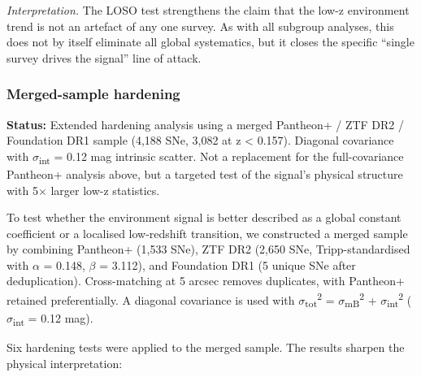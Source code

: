 \documentclass[11pt,a4paper]{article}
\begin{document}
\emph{Interpretation.} The LOSO test strengthens the claim that the low-z environment trend is not an artefact of any one survey. As with all subgroup analyses, this does not by itself eliminate all global systematics, but it closes the specific ``single survey drives the signal'' line of attack.

\subsubsection{Merged-sample hardening}
\begin{mdframed}[linecolor=accent,linewidth=0.5pt,backgroundcolor=callout-bg,leftline=true,rightline=true,topline=true,bottomline=true,innerleftmargin=8pt,innerrightmargin=8pt,innertopmargin=6pt,innerbottommargin=6pt]
\textbf{Status:} Extended hardening analysis using a merged Pantheon+ / ZTF DR2 / Foundation DR1 sample (4,188 SNe, 3,082 at z < 0.157). Diagonal covariance with $\sigma$\textsubscript{int} = 0.12 mag intrinsic scatter. Not a replacement for the full-covariance Pantheon+ analysis above, but a targeted test of the signal's physical structure with 5$\times$ larger low-z statistics.
\end{mdframed}

To test whether the environment signal is better described as a global constant coefficient or a localised low-redshift transition, we constructed a merged sample by combining Pantheon+ (1,533 SNe), ZTF DR2 (2,650 SNe, Tripp-standardised with $\alpha$ = 0.148, $\beta$ = 3.112), and Foundation DR1 (5 unique SNe after deduplication). Cross-matching at 5 arcsec removes duplicates, with Pantheon+ retained preferentially. A diagonal covariance is used with $\sigma$\textsubscript{tot}\textsuperscript{2} = $\sigma$\textsubscript{mB}\textsuperscript{2} + $\sigma$\textsubscript{int}\textsuperscript{2} ($\sigma$\textsubscript{int} = 0.12 mag).

Six hardening tests were applied to the merged sample. The results sharpen the physical interpretation:
\end{document}
